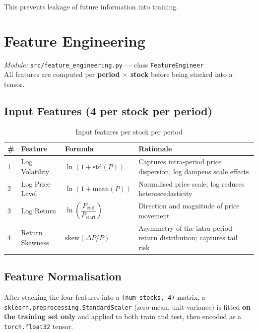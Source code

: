 \documentclass[12pt,a4paper]{article}
\newcommand{\codeinline}[1]{\texttt{\small #1}}
\begin{document}
This prevents leakage of future information into training.

\section{Feature Engineering}

\textit{Module:} \codeinline{src/feature\_engineering.py} — class \codeinline{FeatureEngineer}\\
All features are computed per \textbf{period $\times$ stock} before being stacked into a tensor.

\subsection{Input Features (4 per stock per period)}

\begin{table}[H]
\centering
\begin{tabular}{C{0.5cm} L{3cm} L{5cm} L{4.5cm}}
\toprule
\textbf{\#} & \textbf{Feature} & \textbf{Formula} & \textbf{Rationale} \\
 & Log Volatility   & $\ln(1 + \text{std}(P))$ & Captures intra-period price dispersion; log dampens scale effects \\[0.4em]
2 & Log Price Level  & $\ln(1 + \text{mean}(P))$ & Normalised price scale; log reduces heteroscedasticity \\[0.4em]
3 & Log Return       & $\ln\!\left(\dfrac{P_{\text{end}}}{P_{\text{start}}}\right)$ & Direction and magnitude of price movement \\[0.6em]
4 & Return Skewness  & $\text{skew}(\Delta P / P)$ & Asymmetry of the intra-period return distribution; captures tail risk \\
\bottomrule
\end{tabular}
\caption{Input features per stock per period}
\end{table}

\subsection{Feature Normalisation}
After stacking the four features into a \codeinline{(num\_stocks, 4)} matrix, a \codeinline{sklearn.preprocessing.StandardScaler} (zero-mean, unit-variance) is fitted \textbf{on the training set only} and applied to both train and test, then encoded as a \codeinline{torch.float32} tensor.
\end{document}
